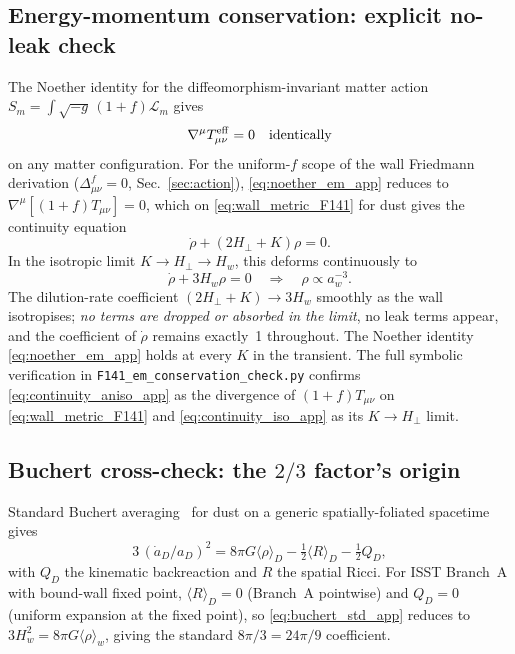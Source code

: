 \documentclass[aps,prd,twocolumn,nofootinbib,floatfix,superscriptaddress]{revtex4-2}
\newcommand{\Lm}{\mathcal{L}_m}
\newcommand{\Teff}{T^{\rm eff}}
\begin{document}
\subsection{Energy-momentum conservation: explicit no-leak check}

The Noether identity for the diffeomorphism-invariant matter action
$S_m = \int\!\sqrt{-g}\,(1{+}f)\Lm$ gives
\begin{equation}
\label{eq:noether_em_app}
\nabla^\mu \Teff_{\mu\nu} = 0 \quad\text{identically}
\end{equation}
on any matter configuration. For the uniform-$f$ scope of the wall
Friedmann derivation ($\Delta^f_{\mu\nu} = 0$, Sec.~\ref{sec:action}),
\eqref{eq:noether_em_app} reduces to $\nabla^\mu[(1{+}f) T_{\mu\nu}] = 0$,
which on \eqref{eq:wall_metric_F141} for dust gives the continuity
equation
\begin{equation}
\label{eq:continuity_aniso_app}
\dot\rho + (2 H_\perp + K)\rho = 0.
\end{equation}
In the isotropic limit $K \to H_\perp \to H_w$, this deforms continuously
to
\begin{equation}
\label{eq:continuity_iso_app}
\dot\rho + 3 H_w \rho = 0 \quad\Longrightarrow\quad \rho \propto a_w^{-3}.
\end{equation}
The dilution-rate coefficient $(2H_\perp + K) \to 3 H_w$ smoothly as
the wall isotropises; \emph{no terms are dropped or absorbed in the
limit}, no leak terms appear, and the coefficient of $\dot\rho$ remains
exactly~1 throughout. The Noether identity \eqref{eq:noether_em_app}
holds at every $K$ in the transient. The full symbolic verification
in \texttt{F141\_em\_conservation\_check.py} confirms
\eqref{eq:continuity_aniso_app} as the divergence of $(1{+}f)T_{\mu\nu}$
on \eqref{eq:wall_metric_F141} and \eqref{eq:continuity_iso_app} as
its $K \to H_\perp$ limit.

\subsection{Buchert cross-check: the $2/3$ factor's origin}

Standard Buchert averaging~\cite{Buchert2000} for dust on a generic
spatially-foliated spacetime gives
\begin{equation}
\label{eq:buchert_std_app}
3\,(\dot a_D/a_D)^2 = 8\pi G\langle\rho\rangle_D
- \tfrac12\langle R\rangle_D - \tfrac12 Q_D,
\end{equation}
with $Q_D$ the kinematic backreaction and $R$ the spatial Ricci. For
ISST Branch~A with bound-wall fixed point, $\langle R\rangle_D = 0$
(Branch~A pointwise) and $Q_D = 0$ (uniform expansion at the fixed
point), so \eqref{eq:buchert_std_app} reduces to $3 H_w^2 = 8\pi
G\langle\rho\rangle_w$, giving the standard $8\pi/3 = 24\pi/9$
coefficient.
\end{document}
